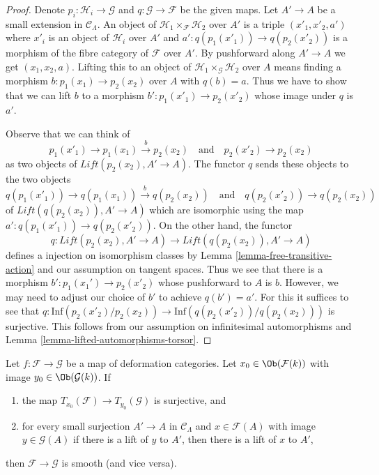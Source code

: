 \begin{proof}
Denote $p_i : \mathcal{H}_i \to \mathcal{G}$ and
$q : \mathcal{G} \to \mathcal{F}$ be the given maps.
Let $A' \to A$ be a small extension in $\mathcal{C}_\Lambda$.
An object of $\mathcal{H}_1 \times_\mathcal{F} \mathcal{H}_2$
over $A'$ is a triple $(x'_1, x'_2, a')$ where
$x'_i$ is an object of $\mathcal{H}_i$ over $A'$ and
$a' : q(p_1(x'_1)) \to q(p_2(x'_2))$ is a morphism
of the fibre category of $\mathcal{F}$ over $A'$.
By pushforward along $A' \to A$ we get
$(x_1, x_2, a)$. Lifting this to an object of
$\mathcal{H}_1 \times_\mathcal{G} \mathcal{H}_2$
over $A$ means finding a morphism
$b : p_1(x_1) \to p_2(x_2)$ over $A$ with $q(b) = a$.
Thus we have to show that we can lift $b$ to a morphism
$b' : p_1(x'_1) \to p_2(x'_2)$ whose image under $q$ is $a'$.

\medskip\noindent
Observe that we can think of
$$
p_1(x'_1) \to p_1(x_1) \xrightarrow{b} p_2(x_2)
\quad\text{and}\quad
p_2(x'_2) \to p_2(x_2)
$$
as two objects of $\textit{Lift}(p_2(x_2), A' \to A)$.
The functor $q$ sends these objects to the two objects
$$
q(p_1(x'_1)) \to q(p_1(x_1)) \xrightarrow{b} q(p_2(x_2))
\quad\text{and}\quad
q(p_2(x'_2)) \to q(p_2(x_2))
$$
of $\textit{Lift}(q(p_2(x_2)), A' \to A)$
which are isomorphic using the map $a' : q(p_1(x'_1)) \to q(p_2(x'_2))$.
On the other hand, the functor
$$
q : \textit{Lift}(p_2(x_2), A' \to A) \to
\textit{Lift}(q(p_2(x_2)), A' \to A)
$$
defines a injection on isomorphism classes by
Lemma \ref{lemma-free-transitive-action}
and our assumption on tangent spaces. Thus we see that there is a morphism
$b' : p_1(x_1') \to p_2(x'_2)$ whose pushforward to $A$ is $b$.
However, we may need to adjust our choice of $b'$
to achieve $q(b') = a'$. For this it suffices to see that
$q : \text{Inf}(p_2(x'_2)/p_2(x_2)) \to \text{Inf}(q(p_2(x'_2))/q(p_2(x_2)))$
is surjective. This follows from our assumption on
infinitesimal automorphisms and Lemma \ref{lemma-lifted-automorphisms-torsor}.
\end{proof}

\begin{lemma}
\label{lemma-easy-check-smooth}
Let $f : \mathcal{F} \to \mathcal{G}$ be a map of deformation
categories. Let $x_0 \in \Ob(\mathcal{F}(k))$ with image
$y_0 \in \Ob(\mathcal{G}(k))$. If
\begin{enumerate}
\item the map $T_{x_0}(\mathcal{F}) \to T_{y_0}(\mathcal{G})$
is surjective, and
\item for every small surjection $A' \to A$ in $\mathcal{C}_\Lambda$
and $x \in \mathcal{F}(A)$ with image $y \in \mathcal{G}(A)$
if there is a lift of $y$ to $A'$, then there is a lift
of $x$ to $A'$,
\end{enumerate}
then $\mathcal{F} \to \mathcal{G}$ is smooth (and vice versa).
\end{lemma}

